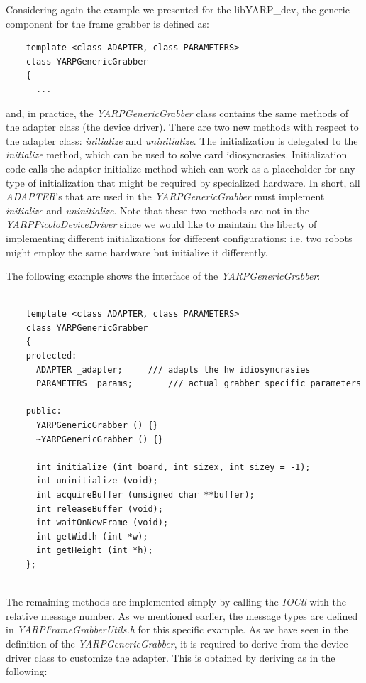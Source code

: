 Considering again the example we presented for the libYARP\_dev, the generic component for the frame grabber is defined as:

\begin{verbatim}
    template <class ADAPTER, class PARAMETERS>
    class YARPGenericGrabber
    {
      ...
\end{verbatim}

\noindent and, in practice, the {\em YARPGenericGrabber} class contains the same methods of the adapter class (the device driver). There are two new methods with respect to the adapter class: {\em initialize} and {\em uninitialize}. The initialization is delegated to the {\em initialize} method, which can be used to solve card idiosyncrasies. Initialization code calls the adapter initialize method which can work as a placeholder for any type of initialization that might be required by specialized hardware. In short, all {\em ADAPTER}'s that are used in the {\em YARPGenericGrabber} must implement {\em initialize} and {\em uninitialize}. Note that these two methods are not in the {\em YARPPicoloDeviceDriver} since we would like to maintain the liberty of implementing different initializations for different configurations: i.e. two robots might employ the same hardware but initialize it differently.

The following example shows the interface of the {\em YARPGenericGrabber}:

\begin{verbatim}

    template <class ADAPTER, class PARAMETERS>
    class YARPGenericGrabber
    {
    protected:
      ADAPTER _adapter;		/// adapts the hw idiosyncrasies
      PARAMETERS _params;		/// actual grabber specific parameters

    public:
      YARPGenericGrabber () {}
      ~YARPGenericGrabber () {}

      int initialize (int board, int sizex, int sizey = -1);
      int uninitialize (void);
      int acquireBuffer (unsigned char **buffer);
      int releaseBuffer (void);
      int waitOnNewFrame (void);
      int getWidth (int *w);
      int getHeight (int *h);
    };
		
\end{verbatim}

The remaining methods are implemented simply by calling the {\em IOCtl} with the relative message number. As we mentioned earlier, the message types are defined in {\em YARPFrameGrabberUtils.h} for this specific example. As we have seen in the definition of the {\em YARPGenericGrabber}, it is required to derive from the device driver class to customize the adapter. This is obtained by deriving as in the following:

